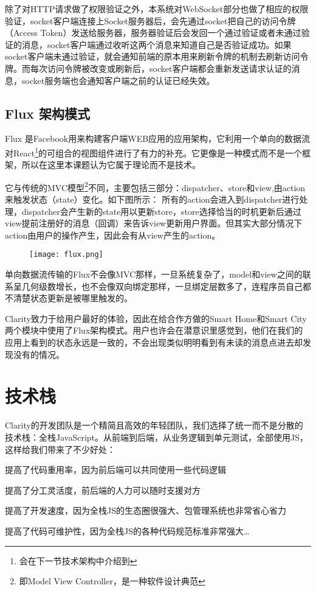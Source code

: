 除了对HTTP请求做了权限验证之外，本系统对WebSocket部分也做了相应的权限验证，socket客户端连接上Socket服务器后，会先通过socket把自己的访问令牌（Access Token）发送给服务器，服务器验证后会发回一个通过验证或者未通过验证的消息，socket客户端通过收听这两个消息来知道自己是否验证成功。如果socket客户端未通过验证，就会通知前端的原本用来刷新令牌的机制去刷新访问令牌。而每次访问令牌被改变或刷新后，socket客户端都会重新发送请求认证的消息，socket服务端也会通知客户端之前的认证已经失效。

\subsection{Flux 架构模式}
Flux 是Facebook用来构建客户端WEB应用的应用架构，它利用一个单向的数据流对React\footnote{会在下一节技术架构中介绍到}的可组合的视图组件进行了有力的补充。它更像是一种模式而不是一个框架，所以在这里本课题认为它属于理论而不是技术。

它与传统的MVC模型\footnote{即Model View Controller，是一种软件设计典范}不同，主要包括三部分：dispatcher、store和view,由action来触发状态（state）变化。如下图所示： 所有的action会进入到dispatcher进行处理，dispatcher会产生新的state用以更新store，store选择恰当的时机更新后通过view提前注册好的消息（回调）来告诉view更新用户界面。但其实大部分情况下action由用户的操作产生，因此会有从view产生的action。

\begin{figure}[!htp]
 \centering
 \texttt{[image: flux.png]}
\end{figure}

单向数据流传输的Flux不会像MVC那样，一旦系统复杂了，model和view之间的联系呈几何级数增长，也不会像双向绑定那样，一旦绑定层数多了，连程序员自己都不清楚状态更新是被哪里触发的。

Clarity致力于给用户最好的体验，因此在给合作方做的Smart Home和Smart City两个模块中使用了Flux架构模式。用户也许会在潜意识里感觉到，他们在我们的应用上看到的状态永远是一致的，不会出现类似明明看到有未读的消息点进去却发现没有的情况。

\section{技术栈}
Clarity的开发团队是一个精简且高效的年轻团队，我们选择了统一而不是分散的技术栈：全栈JavaScript。从前端到后端，从业务逻辑到单元测试，全部使用JS，这样给我们带来了不少好处：
\begin{enumerate*}
  \item 提高了代码重用率，因为前后端可以共同使用一些代码逻辑
  \item 提高了分工灵活度，前后端的人力可以随时支援对方
  \item 提高了开发速度，因为全栈JS的生态圈很强大、包管理系统也非常省心省力
  \item 提高了代码可维护性，因为全栈JS的各种代码规范标准非常强大\ldots
\end{enumerate*}

